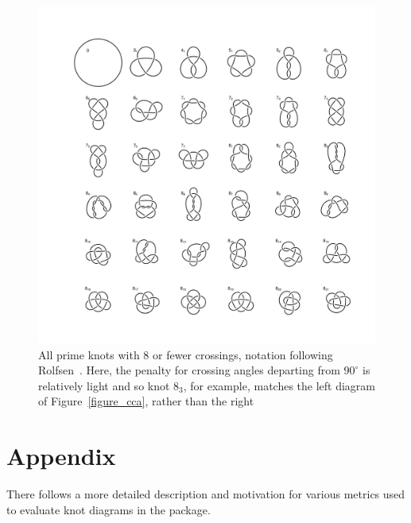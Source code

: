 \documentclass{birkjour}
\theoremstyle{definition}
\theoremstyle{remark}
\numberwithin{equation}{section}
\begin{document}
\begin{figure}[htbp]
  \begin{center}
\includegraphics[width=13cm]{knots_to_8crossings}  %
\caption{All \label{all8} prime knots with 8 or fewer crossings,
  notation following Rolfsen~\cite{rolfsen1976}.  Here, the penalty
  for crossing angles departing from $90^\circ$ is relatively light
  and so knot $8_3$, for example, matches the left diagram of
  Figure~\ref{figure_cca}, rather than the right}
  \end{center}
\end{figure}




\clearpage
\section*{Appendix}

There follows a more detailed description and motivation for various
metrics used to evaluate knot diagrams in the package.
\end{document}
